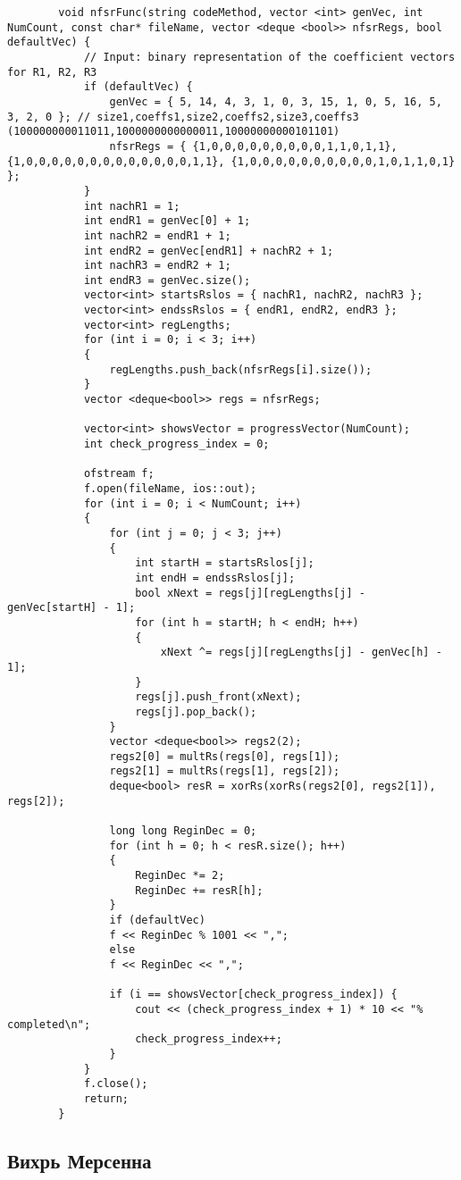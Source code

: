 \documentclass[bachelor, och, coursework]{shiza}
\begin{document}
	\begin{verbatim}
		void nfsrFunc(string codeMethod, vector <int> genVec, int NumCount, const char* fileName, vector <deque <bool>> nfsrRegs, bool defaultVec) {
			// Input: binary representation of the coefficient vectors for R1, R2, R3
			if (defaultVec) {
				genVec = { 5, 14, 4, 3, 1, 0, 3, 15, 1, 0, 5, 16, 5, 3, 2, 0 }; // size1,coeffs1,size2,coeffs2,size3,coeffs3 (100000000011011,1000000000000011,10000000000101101)
				nfsrRegs = { {1,0,0,0,0,0,0,0,0,0,1,1,0,1,1}, {1,0,0,0,0,0,0,0,0,0,0,0,0,0,1,1}, {1,0,0,0,0,0,0,0,0,0,0,1,0,1,1,0,1} };
			}
			int nachR1 = 1;
			int endR1 = genVec[0] + 1;
			int nachR2 = endR1 + 1;
			int endR2 = genVec[endR1] + nachR2 + 1;
			int nachR3 = endR2 + 1;
			int endR3 = genVec.size();
			vector<int> startsRslos = { nachR1, nachR2, nachR3 };
			vector<int> endssRslos = { endR1, endR2, endR3 };
			vector<int> regLengths;
			for (int i = 0; i < 3; i++)
			{
				regLengths.push_back(nfsrRegs[i].size());
			}
			vector <deque<bool>> regs = nfsrRegs;
			
			vector<int> showsVector = progressVector(NumCount);
			int check_progress_index = 0;
			
			ofstream f;
			f.open(fileName, ios::out);
			for (int i = 0; i < NumCount; i++)
			{
				for (int j = 0; j < 3; j++)
				{
					int startH = startsRslos[j];
					int endH = endssRslos[j];
					bool xNext = regs[j][regLengths[j] - genVec[startH] - 1];
					for (int h = startH; h < endH; h++)
					{
						xNext ^= regs[j][regLengths[j] - genVec[h] - 1];
					}
					regs[j].push_front(xNext);
					regs[j].pop_back();
				}
				vector <deque<bool>> regs2(2);
				regs2[0] = multRs(regs[0], regs[1]);
				regs2[1] = multRs(regs[1], regs[2]);
				deque<bool> resR = xorRs(xorRs(regs2[0], regs2[1]), regs[2]);
				
				long long ReginDec = 0;
				for (int h = 0; h < resR.size(); h++)
				{
					ReginDec *= 2;
					ReginDec += resR[h];
				}
				if (defaultVec)
				f << ReginDec % 1001 << ",";
				else
				f << ReginDec << ",";
				
				if (i == showsVector[check_progress_index]) {
					cout << (check_progress_index + 1) * 10 << "% completed\n";
					check_progress_index++;
				}
			}
			f.close();
			return;
		}
	\end{verbatim}
	

	\subsection{Вихрь Мерсенна}
	
\end{document}
